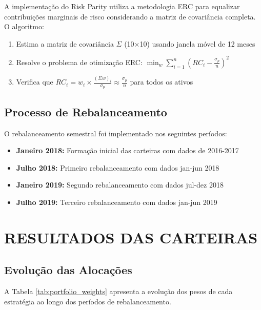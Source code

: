 A implementação do Risk Parity utiliza a metodologia ERC para equalizar contribuições marginais de risco considerando a matriz de covariância completa. O algoritmo:

\begin{enumerate}
    \item Estima a matriz de covariância $\Sigma$ (10×10) usando janela móvel de 12 meses
    \item Resolve o problema de otimização ERC: $\min_{w} \sum_{i=1}^{n} \left( RC_i - \frac{\sigma_p}{n} \right)^2$
    \item Verifica que $RC_i = w_i \times \frac{(\Sigma w)_i}{\sigma_p} \approx \frac{\sigma_p}{n}$ para todos os ativos
\end{enumerate}

\subsection{Processo de Rebalanceamento}

O rebalanceamento semestral foi implementado nos seguintes períodos:
\begin{itemize}
    \item \textbf{Janeiro 2018:} Formação inicial das carteiras com dados de 2016-2017
    \item \textbf{Julho 2018:} Primeiro rebalanceamento com dados jan-jun 2018
    \item \textbf{Janeiro 2019:} Segundo rebalanceamento com dados jul-dez 2018
    \item \textbf{Julho 2019:} Terceiro rebalanceamento com dados jan-jun 2019
\end{itemize}

\section{RESULTADOS DAS CARTEIRAS}

\subsection{Evolução das Alocações}

A Tabela \ref{tab:portfolio_weights} apresenta a evolução dos pesos de cada estratégia ao longo dos períodos de rebalanceamento.


